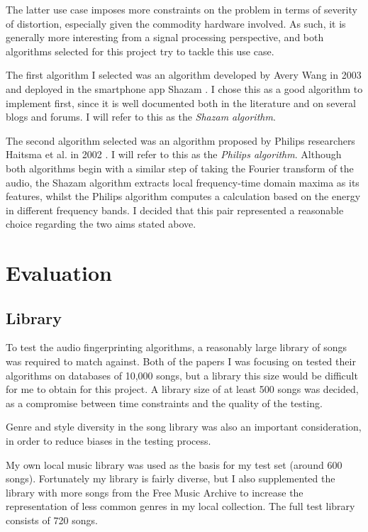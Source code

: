\documentclass[12pt,a4paper,twoside,openright]{report}
\begin{document}
The latter use case imposes more constraints on the problem in terms of severity of distortion, especially given the commodity hardware involved. As such, it is generally more interesting from a signal processing perspective, and both algorithms selected for this project try to tackle this use case.

The first algorithm I selected was an algorithm developed by Avery Wang in 2003 and deployed in the smartphone app Shazam \cite{Wang03}. I chose this as a good algorithm to implement first, since it is well documented both in the literature and on several blogs and forums. I will refer to this as the \textit{Shazam algorithm}.

The second algorithm selected was an algorithm proposed by Philips researchers Haitsma et al. in 2002 \cite{Haitsma02}. I will refer to this as the \textit{Philips algorithm}. Although both algorithms begin with a similar step of taking the Fourier transform of the audio, the Shazam algorithm extracts local frequency-time domain maxima as its features, whilst the Philips algorithm computes a calculation based on the energy in different frequency bands. I decided that this pair represented a reasonable choice regarding the two aims stated above.


\section{Evaluation}

\subsection{Library}

To test the audio fingerprinting algorithms, a reasonably large library of songs was required to match against. Both of the papers I was focusing on tested their algorithms on databases of 10,000 songs, but a library this size would be difficult for me to obtain for this project. A library size of at least 500 songs was decided, as a compromise between time constraints and the quality of the testing.

Genre and style diversity in the song library was also an important consideration, in order to reduce biases in the testing process.

My own local music library was used as the basis for my test set (around 600 songs). Fortunately my library is fairly diverse, but I also supplemented the library with more songs from the Free Music Archive to increase the representation of less common genres in my local collection. The full test library consists of 720 songs.
\end{document}
